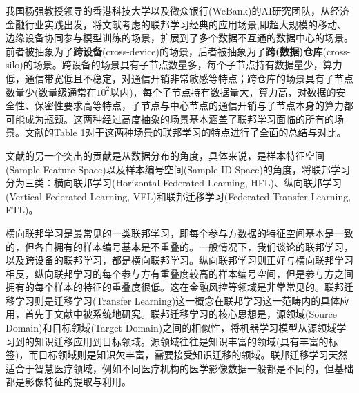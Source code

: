 我国杨强教授领导的香港科技大学以及微众银行(WeBank)的AI研究团队，从经济金融行业实践出发，将文献\parencite{mcmahan2017fed_avg}考虑的联邦学习经典的应用场景,即超大规模的移动、边缘设备协同参与模型训练的场景，扩展到了多个数据不互通的数据中心的场景\cite{Yang_2019_VFL}。前者被抽象为了\textbf{跨设备}(cross-device)的场景，后者被抽象为了\textbf{跨(数据)仓库}(cross-silo)的场景\cite{kairouz2019advances_fl}。跨设备的场景具有子节点数量多，每个子节点持有数据量少，算力低，通信带宽低且不稳定，对通信开销非常敏感等特点；跨仓库的场景具有子节点数量少(数量级通常在$10^2$以内)，每个子节点持有数据量大，算力高，对数据的安全性、保密性要求高等特点，子节点与中心节点的通信开销与子节点本身的算力都可能成为瓶颈。这两种经过高度抽象的场景基本涵盖了联邦学习面临的所有的场景。文献\parencite{kairouz2019advances_fl}的Table 1对于这两种场景的联邦学习的特点进行了全面的总结与对比。

文献\parencite{Yang_2019_VFL}的另一个突出的贡献是从数据分布的角度，具体来说，是样本特征空间(Sample Feature Space)以及样本编号空间(Sample ID Space)的角度，将联邦学习分为三类：横向联邦学习(Horizontal Federated Learning, HFL)、纵向联邦学习(Vertical Federated Learning, VFL)和联邦迁移学习(Federated Transfer Learning, FTL)。

横向联邦学习是最常见的一类联邦学习，即每个参与方数据的特征空间基本是一致的，但各自拥有的样本编号基本是不重叠的。一般情况下，我们谈论的联邦学习，以及跨设备的联邦学习，都是横向联邦学习。纵向联邦学习则正好与横向联邦学习相反，纵向联邦学习的每个参与方有重叠度较高的样本编号空间，但是参与方之间拥有的每个样本的特征的重叠度很低。这在金融风控等领域是非常常见的。联邦迁移学习则是迁移学习(Transfer Learning)这一概念在联邦学习这一范畴内的具体应用，首先于文献\parencite{liu_2020_transfer_fl}中被系统地研究。联邦迁移学习的核心思想是，源领域(Source Domain)和目标领域(Target Domain)之间的相似性，将机器学习模型从源领域学习到的知识迁移应用到目标领域。源领域往往是知识丰富的领域(具有丰富的标签)，而目标领域则是知识欠丰富，需要接受知识迁移的领域。联邦迁移学习天然适合于智慧医疗领域，例如不同医疗机构的医学影像数据一般都是不同的，但基础都是影像特征的提取与利用。

